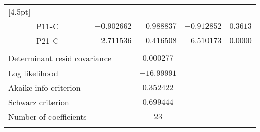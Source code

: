\begin{tabular}{lrrrr}
[4.5pt] \hline \\ [-4.5pt]
\multicolumn{1}{c}{P11-C}&\multicolumn{1}{r}{$-0.902662$}&\multicolumn{1}{r}{$0.988837$}&\multicolumn{1}{r}{$-0.912852$}&\multicolumn{1}{c}{$0.3613$}\\
\multicolumn{1}{c}{P21-C}&\multicolumn{1}{r}{$-2.711536$}&\multicolumn{1}{r}{$0.416508$}&\multicolumn{1}{r}{$-6.510173$}&\multicolumn{1}{c}{$0.0000$}\\
[4.5pt] \hline \\ [-4.5pt]
\multicolumn{2}{l}{Determinant resid covariance}&\multicolumn{1}{c}{$0.000277$}&\multicolumn{1}{c}{}&\multicolumn{1}{c}{}\\
\multicolumn{1}{l}{Log likelihood}&\multicolumn{1}{c}{}&\multicolumn{1}{c}{$-16.99991$}&\multicolumn{1}{c}{}&\multicolumn{1}{c}{}\\
\multicolumn{1}{l}{Akaike info criterion}&\multicolumn{1}{c}{}&\multicolumn{1}{c}{$0.352422$}&\multicolumn{1}{c}{}&\multicolumn{1}{c}{}\\
\multicolumn{1}{l}{Schwarz criterion}&\multicolumn{1}{c}{}&\multicolumn{1}{c}{$0.699444$}&\multicolumn{1}{c}{}&\multicolumn{1}{c}{}\\
\multicolumn{1}{l}{Number of coefficients}&\multicolumn{1}{c}{}&\multicolumn{1}{c}{$23$}&\multicolumn{1}{c}{}&\multicolumn{1}{c}{}\\
[4.5pt] \hline \\ [-4.5pt]
\end{tabular}

